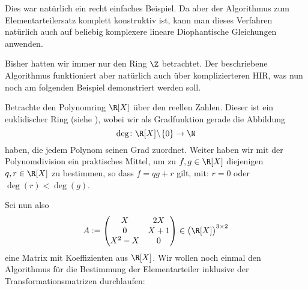 Dies war natürlich ein recht einfaches Beispiel. Da aber der Algorithmus zum
Elementarteilersatz komplett konstruktiv ist, kann man dieses Verfahren
natürlich auch auf beliebig komplexere lineare Diophantische Gleichungen
anwenden.

Bisher hatten wir immer nur den Ring $\Z$ betrachtet. Der beschriebene
Algorithmus funktioniert aber natürlich auch über komplizierteren HIR, was nun
noch am folgenden Beispiel demonstriert werden soll.

\begin{thBeisp}\label{bsp:polyring}
    Betrachte den Polynomring $\R[X]$ über den reellen Zahlen. Dieser ist ein
    euklidischer Ring (siehe \cite[Kor.~5]{talk:rief}), 
    wobei wir als Gradfunktion gerade die Abbildung \vspace*{-7pt}
    \[ \deg\colon\R[X]\!\setminus\!\{0\}\to\N       \vspace*{-7pt}   \] 
    haben, die jedem Polynom seinen Grad zuordnet. Weiter haben wir mit der
    Polynomdivision ein praktisches Mittel, um zu $f,g\in\R[X]$ diejenigen
    $q,r\in\R[X]$ zu bestimmen, so dass $f = qg+r$ gilt, mit: $r=0$ oder
    $\deg(r)<\deg(g)$.
    
    Sei nun also
    \[ A := \Matrix{ X      &  2X   \\
                     0      &  X+1  \\
                     X^2-X  &  0     }  
    \in \bigl(\R[X]\bigr)^{3\times2}
    \]
    eine Matrix mit Koeffizienten aus $\R[X]$. Wir wollen noch einmal den
    Algorithmus für die Bestimmung der Elementarteiler inklusive der
    Transformationsmatrizen durchlaufen:
    

\end{thBeisp}
